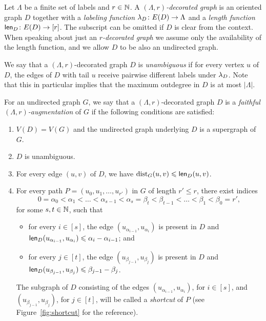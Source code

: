 
\begin{definition}
	Let $\Lambda$ be a finite set of labels and $r\in \mathbb{N}$.
	A \emph{$(\Lambda,r)$-decorated graph} is an oriented graph $D$ together with a \emph{labeling function} $\lambda_D\colon E(D)\to \Lambda$ and a \emph{length function} $\mathsf{len}_D\colon E(D)\to [r]$. The subscript can be omitted if $D$ is clear from the context. When speaking about just an \emph{$r$-decorated graph} we assume only the availability of the length function, and we allow $D$ to be also an undirected graph.
	
	We say that a $(\Lambda,r)$-decorated graph $D$ is \emph{unambiguous} if for every vertex $u$ of $D$, the edges of $D$ with tail $u$ receive pairwise different labels under $\lambda_D$. Note that this in particular implies that the maximum outdegree in $D$ is at most $|\Lambda|$.
	
	For an undirected graph $G$, we say that a $(\Lambda,r)$-decorated graph $D$ is a \emph{faithful $(\Lambda,r)$-augmentation} of $G$ if the following conditions are satisfied:
	\begin{enumerate}[label={(A\arabic*)}]
		\item $V(D)=V(G)$ and the undirected graph underlying $D$ is a supergraph of $G$.
		\item $D$ is unambiguous.
		\item\label{c:short} For every edge $(u,v)$ of $D$, we have $\mathrm{dist}_G(u,v)\leqslant \mathsf{len}_D(u,v)$.
		\item\label{c:center} For every path $P=(u_0,u_1,\ldots,u_{r'})$ in $G$ of length $r'\leq r$, there exist indices 
		\[0=\alpha_0< \alpha_1< \ldots <\alpha_{s-1}<\alpha_s = \beta_t< \beta_{t-1}< \ldots< \beta_1< \beta_0=r',\]
		for some $s,t\in \mathbb{N}$, such that 
		\begin{itemize}
			\item for every $i\in [s]$, the edge $(u_{\alpha_{i-1}},u_{\alpha_i})$ is present in $D$ and $\mathsf{len}_D(u_{\alpha_{i-1}},u_{\alpha_i})\leqslant \alpha_i-\alpha_{i-1}$; and 
			\item for every $j\in [t]$, the edge $(u_{\beta_{j-1}},u_{\beta_j})$ is present in $D$ and $\mathsf{len}_D(u_{\beta_{j-1}},u_{\beta_j})\leqslant \beta_{j-1}-\beta_{j}$. 
		\end{itemize}
		The subgraph of $D$ consisting of the edges  $(u_{\alpha_{i-1}},u_{\alpha_i})$, for $i\in [s]$, and  $(u_{\beta_{j-1}},u_{\beta_j})$, for $j\in [t]$, will be called a \emph{shortcut} of $P$ (see Figure~\ref{fig:shortcut} for the reference).
	\end{enumerate}
\end{definition}

